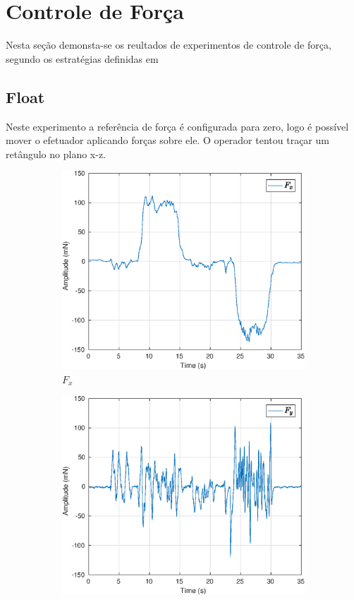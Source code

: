 \section{Controle de Força}

Nesta seção demonsta-se os reultados de experimentos de controle de força, segundo os estratégias definidas em 
\subsection{Float}
Neste experimento a referência de força é configurada para zero, logo é possível mover o efetuador aplicando forças sobre ele. O operador tentou traçar um retângulo no plano x-z.

\begin{figure}[H]
\centering
\begin{subfigure}{.5\textwidth}
  \centering
  \includegraphics[width=\linewidth]{./img/float2/Fx.eps}
  \caption{$F_x$}
  \label{fig:sub1}
\end{subfigure}%
\begin{subfigure}{.5\textwidth}
  \centering
  \includegraphics[width=\linewidth]{./img/float2/Fy.eps}

\end{subfigure}
\end{figure}
